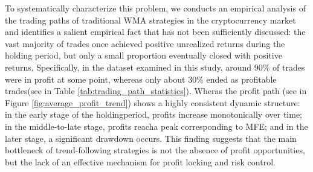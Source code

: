 \documentclass[12pt]{article}
\begin{document}
To systematically characterize this problem, we conducts an empirical analysis of the trading 
paths of traditional WMA strategies in the cryptocurrency market and identifies a salient 
empirical fact that has not been sufficiently discussed: the vast majority of trades 
once achieved positive unrealized returns during the holding period, but only a small proportion 
eventually closed with positive returns. Specifically, in the dataset examined in this study, 
around 90\% of trades were in profit at some point, whereas only about 30\% ended as profitable 
trades(see in Table \ref{tab:trading_path_statistics}). Wheras the profit path
(see in Figure \ref{fig:average_profit_trend}) shows a highly consistent dynamic structure: 
in the early stage of the holdingperiod, profits increase monotonically over time; in the 
middle-to-late stage, profits reacha peak corresponding to MFE; and in the later stage, a 
significant drawdown occurs. This finding suggests that the main bottleneck of trend-following 
strategies is not the absence of profit opportunities, but the lack of an effective 
mechanism for profit locking and risk control.
\end{document}
